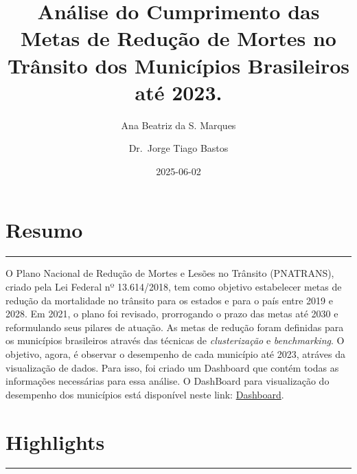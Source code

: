 \documentclass[
  letterpaper,
  DIV=11,
  numbers=noendperiod]{scrreprt}
\title{Análise do Cumprimento das Metas de Redução de Mortes no Trânsito
dos Municípios Brasileiros até 2023.}
\author{Ana Beatriz da S. Marques \and Dr.~Jorge Tiago Bastos}
\date{2025-06-02}
\renewcommand*\contentsname{Table of contents}
\newcommand\contentsname{Table of contents}
\begin{document}
\maketitle

\renewcommand*\contentsname{Table of contents}
{
\hypersetup{linkcolor=}
\setcounter{tocdepth}{2}
\tableofcontents
}


\chapter*{Resumo}\label{resumo}


\begin{center}\rule{0.5\linewidth}{0.5pt}\end{center}

O Plano Nacional de Redução de Mortes e Lesões no Trânsito (PNATRANS),
criado pela Lei Federal nº 13.614/2018, tem como objetivo estabelecer
metas de redução da mortalidade no trânsito para os estados e para o
país entre 2019 e 2028. Em 2021, o plano foi revisado, prorrogando o
prazo das metas até 2030 e reformulando seus pilares de atuação. As
metas de redução foram definidas para os municípios brasileiros através
das técnicas de \emph{clusterização} e \emph{benchmarking}. O objetivo,
agora, é observar o desempenho de cada município até 2023, atráves da
visualização de dados. Para isso, foi criado um Dashboard que contém
todas as informações necessárias para essa análise. O DashBoard para
visualização do desempenho dos municípios está disponível neste link:
\href{https://beatrizmarques.shinyapps.io/cumprimento_metas/}{Dashboard}.


\chapter*{Highlights}\label{highlights}


\begin{center}\rule{0.5\linewidth}{0.5pt}\end{center}
\end{document}
